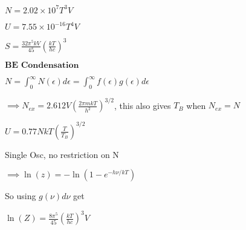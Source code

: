 \documentclass{article}
\begin{document}
\begin{multicols}{3}
$N=2.02\times 10^7 T^3 V$

$U=7.55\times 10^{-16}T^4V$

$S=\frac{32\pi^5 kV}{45}\left ( \frac{kT}{hc} \right ) ^3$

$\textbf{BE Condensation}$

$N=\int_0^\infty N(\epsilon)d\epsilon = \int_0^\infty f(\epsilon)g(\epsilon)d\epsilon$

$\implies N_{ex}=2.612 V \left ( \frac{2\pi mkT}{h^2} \right )^{3/2}$, this also gives $T_B$ when $N_{ex}=N$

$U=0.77 NkT \left ( \frac{T}{T_B}  \right )^{3/2}$

Single Osc, no restriction on N

$\implies \ln(z)=-\ln(1-e^{-h\nu / kT})$

So using $g(\nu)d\nu$ get

$\ln(Z)=\frac{8\pi^5}{45} \left ( \frac{kT}{hc} \right )^3 V$

\end{multicols}
\end{document}
